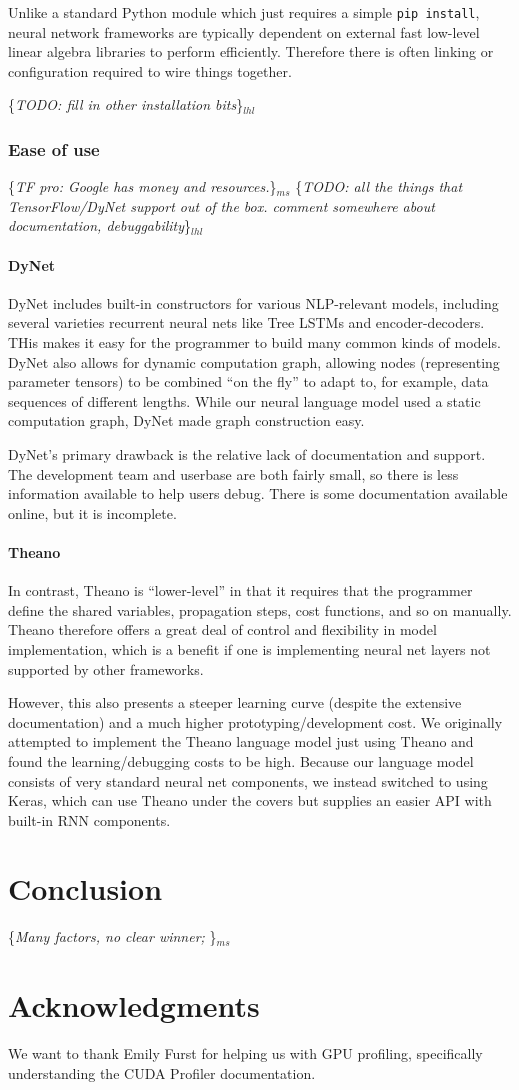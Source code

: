 \documentclass{article}
\newcommand{\ms}[1]{{\color{cyan}\{\textit{#1}\}$_{ms}$}}
\newcommand{\lhl}[1]{{\color{magenta}\{\textit{#1}\}$_{lhl}$}}
\begin{document}
Unlike a standard Python module which just requires a simple \texttt{pip install}, neural network frameworks are typically dependent on external fast low-level linear algebra libraries to perform efficiently. Therefore there is often linking or configuration required to wire things together.

\lhl{TODO: fill in other installation bits}

\subsubsection{Ease of use}
\ms{TF pro: Google has money and resources.}
\lhl{TODO: all the things that TensorFlow/DyNet support out of the box.
comment somewhere about documentation, debuggability}

\paragraph{DyNet}
DyNet includes built-in constructors for various NLP-relevant models, including several varieties recurrent neural nets like Tree LSTMs and encoder-decoders. THis makes it easy for the programmer to build many common kinds of models. DyNet also allows for dynamic computation graph, allowing nodes (representing parameter tensors) to be combined ``on the fly'' to adapt to, for example, data sequences of different lengths. While our neural language model used a static computation graph, DyNet made graph construction easy.

DyNet's primary drawback is the relative lack of documentation and support. The development team and userbase are both fairly small, so there is less information available to help users debug. There is some documentation available online, but it is incomplete.

\paragraph{Theano} 
In contrast, Theano is ``lower-level'' in that it requires that the programmer define the shared variables, propagation steps, cost functions, and so on manually. Theano therefore offers a great deal of control and flexibility in model implementation, which is a benefit if one is implementing neural net layers not supported by other frameworks.

However, this also presents a steeper learning curve (despite the extensive documentation) and a much higher prototyping/development cost. We originally attempted to implement the Theano language model just using Theano and found the learning/debugging costs to be high. Because our language model consists of very standard neural net components, we instead switched to using Keras, which can use Theano under the covers but supplies an easier API with built-in RNN components.



\section{Conclusion}
\ms{Many factors, no clear winner; }

\section*{Acknowledgments}
We want to thank Emily Furst for helping us with GPU profiling, specifically understanding the CUDA Profiler documentation.
\newpage


\end{document}
